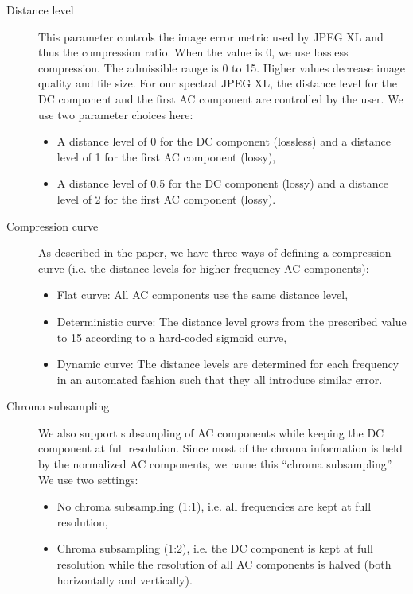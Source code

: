 \begin{description}
    \item[Distance level] This parameter controls the image error metric used by JPEG XL and thus the compression ratio. When the value is 0, we use lossless compression. The admissible range is 0 to 15. Higher values decrease image quality and file size. For our spectral JPEG XL, the distance level for the DC component and the first AC component are controlled by the user. We use two parameter choices here:
    \begin{itemize}
        \item A distance level of 0 for the DC component (lossless) and a distance level of 1 for the first AC component (lossy),
        \item A distance level of 0.5 for the DC component (lossy) and a distance level of 2 for the first AC component (lossy).
    \end{itemize}
    \item[Compression curve] As described in the paper, we have three ways of defining a compression curve (i.e. the distance levels for higher-frequency AC components):
    \begin{itemize}
        \item Flat curve: All AC components use the same distance level,
        \item Deterministic curve: The distance level grows from the prescribed value to 15 according to a hard-coded sigmoid curve,
        \item Dynamic curve: The distance levels are determined for each frequency in an automated fashion such that they all introduce similar error.
    \end{itemize}
    \item[Chroma subsampling] We also support subsampling of AC components while keeping the DC component at full resolution. Since most of the chroma information is held by the normalized AC components, we name this ``chroma subsampling''. We use two settings:
        \begin{itemize}
            \item No chroma subsampling (1:1), i.e. all frequencies are kept at full resolution,
            \item Chroma subsampling (1:2), i.e. the DC component is kept at full resolution while the resolution of all AC components is halved (both horizontally and vertically).
        \end{itemize}
\end{description}

